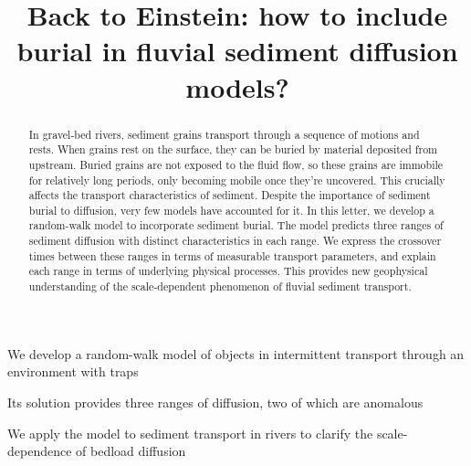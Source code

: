 \documentclass[]{agujournal2018}
\begin{document}
\title{Back to Einstein: how to include burial in fluvial sediment diffusion models?}


\begin{keypoints}
\item We develop a random-walk model of objects in intermittent transport through an environment with traps
\item Its solution provides three ranges of diffusion, two of which are anomalous
\item We apply the model to sediment transport in rivers to clarify the scale-dependence of bedload diffusion

\end{keypoints}

\begin{abstract}
	

In gravel-bed rivers, sediment grains transport through a sequence of motions and rests.
When grains rest on the surface, they can be buried by material deposited from upstream.
Buried grains are not exposed to the fluid flow, so these grains are immobile for relatively long periods, only becoming mobile once they're uncovered.  
This crucially affects the transport characteristics of sediment.
Despite the importance of sediment burial to diffusion, very few models have accounted for it.
In this letter, we develop a random-walk model to incorporate sediment burial.
The model predicts three ranges of sediment diffusion with distinct characteristics in each range.
We express the crossover times between these ranges in terms of measurable transport parameters, and explain each range in terms of underlying physical processes.
This provides new geophysical understanding of the scale-dependent phenomenon of fluvial sediment transport.
\end{abstract}
\end{document}
